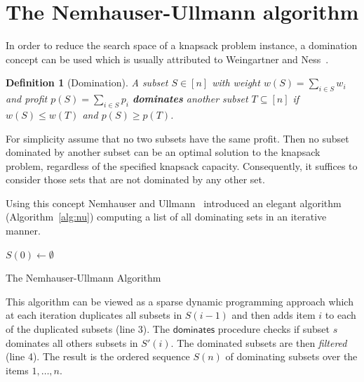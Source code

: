 \documentclass{article}
\newtheorem{mydef}{Definition}
\let\emph\textbf
\begin{document}
\section{The Nemhauser-Ullmann algorithm}
\label{sec:dp}
In order to reduce the search space of a knapsack problem instance, a domination
concept can be used which is usually attributed to Weingartner and Ness~\cite{weingartner1967methods}.
\begin{mydef}[Domination]
A subset $S \in [n]$ with weight $w(S) = \sum_{i \in S} w_i$  and profit $p(S) = \sum_{i \in S} p_i$
\emph{dominates} another subset $T \subseteq [n]$ if $w(S) \leqslant w(T)$ and $p(S) \geqslant p(T)$.
\end{mydef}

For simplicity assume that no two subsets have the same profit.
Then no subset dominated by another subset can be an optimal solution to the knapsack problem, regardless of the specified knapsack capacity.
Consequently, it suffices to consider those sets that are not dominated by any other set.

Using this concept Nemhauser and Ullmann~\cite{nemhauser1969discrete} introduced an elegant
algorithm (Algorithm~\ref{alg:nu}) computing a list of all dominating sets in an iterative manner.

\begin{algorithm}[H]
 $S(0) \leftarrow \emptyset $\;
 \caption{The Nemhauser-Ullmann Algorithm}
 \label{alg:nu}
\end{algorithm}

This algorithm can be viewed as a sparse dynamic programming approach which
at each iteration duplicates all subsets in $S(i-1)$ and then adds item $i$
to each of the duplicated subsets (line 3).
The $\mathsf{dominates}$ procedure checks if subset $s$ dominates all others subsets in $S'(i)$.
The dominated subsets are then {\it filtered} (line 4).
The result is the ordered sequence $S(n)$ of dominating subsets over the items $1, \ldots, n$.
\end{document}
